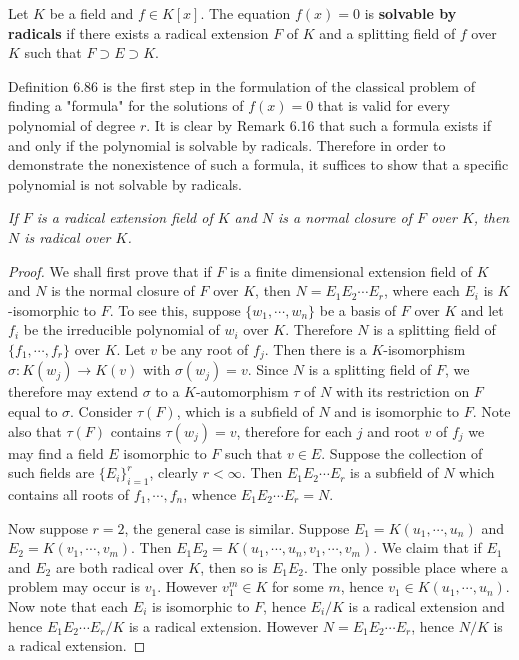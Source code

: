 \begin{definition}
Let $K$ be a field and $f\in K[x]$. The equation $f(x)=0$ is \textbf{solvable by radicals} if there exists a radical extension $F$ of $K$ and a splitting field of $f$ over $K$ such that $F\supset E\supset K$.
\end{definition}
Definition 6.86 is the first step in the formulation of the classical problem of finding a "formula" for the solutions of $f(x)=0$ that is valid for every polynomial of degree $r$. It is clear by Remark 6.16 that such a formula exists if and only if the polynomial is solvable by radicals. Therefore in order to demonstrate the nonexistence of such a formula, it suffices to show that a specific polynomial is not solvable by radicals.
\begin{lemma}\em
If $F$ is a radical extension field of $K$ and $N$ is a normal closure of $F$ over $K$, then $N$ is radical over $K$.
\end{lemma}
\begin{proof}
We shall first prove that if $F$ is a finite dimensional extension field of $K$ and $N$ is the normal closure of $F$ over $K$, then $N=E_1E_2\cdots E_r$, where each $E_i$ is $K$-isomorphic to $F$. To see this, suppose $\{w_1,\cdots,w_n\}$ be a basis of $F$ over $K$ and let $f_i$ be the irreducible polynomial of $w_i$ over $K$. Therefore $N$ is a splitting field of $\{f_1,\cdots,f_r\}$ over $K$. Let $v$ be any root of $f_j$. Then there is a $K$-isomorphism $\sigma:K(w_j)\to K(v)$ with $\sigma(w_j)=v$. Since $N$ is a splitting field of $F$, we therefore may extend $\sigma$ to a $K$-automorphism $\tau$ of $N$ with its restriction on $F$ equal to $\sigma$. Consider $\tau(F)$, which is a subfield of $N$ and is isomorphic to $F$. Note also that $\tau(F)$ contains $\tau(w_j)=v$, therefore for each $j$ and root $v$ of $f_j$ we may find a field $E$ isomorphic to $F$ such that $v\in E$. Suppose the collection of such fields are $\{E_i\}_{i=1}^r$, clearly $r<\infty$. Then $E_1E_2\cdots E_r$ is a subfield of $N$ which contains all roots of $f_1,\cdots,f_n$, whence $E_1E_2\cdots E_r=N$.\par
Now suppose $r=2$, the general case is similar. Suppose $E_1=K(u_1,\cdots,u_n)$ and $E_2=K(v_1,\cdots,v_m)$. Then $E_1E_2=K(u_1,\cdots,u_n,v_1,\cdots,v_m)$. We claim that if $E_1$ and $E_2$ are both radical over $K$, then so is $E_1E_2$. The only possible place where a problem may occur is $v_1$. However $v_1^m\in K$ for some $m$, hence $v_1\in K(u_1,\cdots,u_n)$. Now note that each $E_i$ is isomorphic to $F$, hence $E_i/K$ is a radical extension and hence $E_1E_2\cdots E_r/K$ is a radical extension. However $N=E_1E_2\cdots E_r$, hence $N/K$ is a radical extension.
\end{proof}
